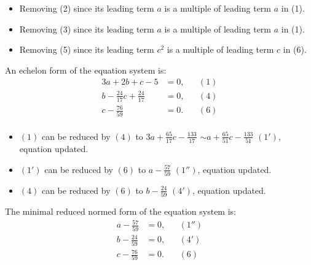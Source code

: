 {\scriptsize
\begin{itemize}

\item Removing (2) since its leading term $a$ is a multiple of leading term $a$ in (1).


\item Removing (3) since its leading term $a$ is a multiple of leading term $a$ in (1).


\item Removing (5) since its leading term $c^{2}$ is a multiple of leading term $c$ in (6).

\end{itemize}
An echelon form of the equation system is:
\begin{align*}
3a+2b+c-5&= 0, &&(1)\\
b-\frac{24}{17}c+\frac{24}{17}&= 0, &&(4)\\
c-\frac{76}{59}&= 0. &&(6)\\
\end{align*}
\begin{itemize}
\item $(1)$ can be reduced by $(4)$ to $3a+\frac{65}{17}c-\frac{133}{17}$
 $\sim a+\frac{65}{51}c-\frac{133}{51}$
$(1')$, equation updated.
\item $(1')$ can be reduced by $(6)$ to $a-\frac{57}{59}$
$(1'')$, equation updated.
\item $(4)$ can be reduced by $(6)$ to $b-\frac{24}{59}$
$(4')$, equation updated.
\end{itemize}
The minimal reduced normed form of the equation system is:
\begin{align*}
a-\frac{57}{59}&= 0, &&(1'')\\
b-\frac{24}{59}&= 0, &&(4')\\
c-\frac{76}{59}&= 0. &&(6)\\
\end{align*}
}
